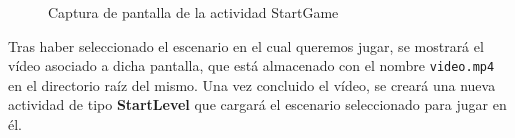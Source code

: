 \begin{figure}[h!]
	\centering	
	 \hspace*{0.5cm}
	\caption{Captura de pantalla de la actividad StartGame}
\end{figure}

Tras haber seleccionado el escenario en el cual queremos jugar, se mostrará el vídeo asociado a dicha pantalla, que está almacenado con el nombre \texttt{video.mp4} en el directorio raíz del mismo. Una vez concluido el vídeo, se creará una nueva actividad de tipo \textbf{StartLevel} que cargará el escenario seleccionado para jugar en él.
\newline

